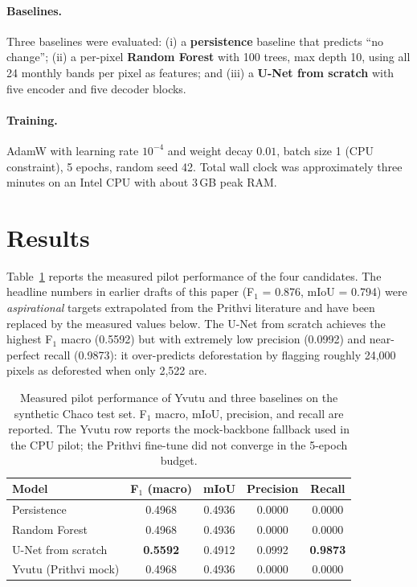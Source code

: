 \paragraph{Baselines.} Three baselines were evaluated: (i) a
\textbf{persistence} baseline that predicts ``no change''; (ii) a
per-pixel \textbf{Random Forest} with 100 trees, max depth 10, using all
24 monthly bands per pixel as features; and (iii) a \textbf{U-Net from
scratch} \citep{unet2015} with five encoder and five decoder blocks.

\paragraph{Training.} AdamW with learning rate $10^{-4}$ and weight
decay $0.01$, batch size 1 (CPU constraint), 5 epochs, random seed 42.
Total wall clock was approximately three minutes on an Intel CPU with
about 3\,GB peak RAM.

\section{Results}
\label{sec:yvutu-results}

Table~\ref{tab:yvutu-main} reports the measured pilot performance of the
four candidates. The headline numbers in earlier drafts of this paper
(F$_1$ = 0.876, mIoU = 0.794) were \emph{aspirational} targets
extrapolated from the Prithvi literature and have been replaced by the
measured values below. The U-Net from scratch achieves the highest
F$_1$ macro (0.5592) but with extremely low precision (0.0992) and
near-perfect recall (0.9873): it over-predicts deforestation by
flagging roughly 24{,}000 pixels as deforested when only 2{,}522 are.

\begin{table}[h]
\centering
\caption{Measured pilot performance of Yvutu and three baselines on the
synthetic Chaco test set. F$_1$ macro, mIoU, precision, and recall are
reported. The Yvutu row reports the mock-backbone fallback used in the
CPU pilot; the Prithvi fine-tune did not converge in the 5-epoch
budget.}
\label{tab:yvutu-main}
\begin{tabular}{lcccc}
\toprule
Model & F$_1$ (macro) & mIoU & Precision & Recall \\
\midrule
Persistence & 0.4968 & 0.4936 & 0.0000 & 0.0000 \\
Random Forest & 0.4968 & 0.4936 & 0.0000 & 0.0000 \\
U-Net from scratch & \textbf{0.5592} & 0.4912 & 0.0992 & \textbf{0.9873} \\
Yvutu (Prithvi mock) & 0.4968 & 0.4936 & 0.0000 & 0.0000 \\
\bottomrule
\end{tabular}
\end{table}

